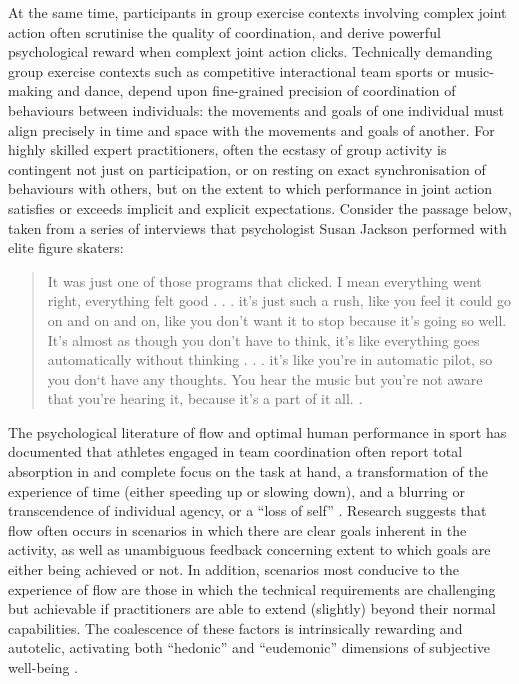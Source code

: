 \begin{CJK}{UTF8}{gbsn}
At the same time, participants in group exercise contexts involving complex joint action often scrutinise the quality of coordination, and derive powerful psychological reward when complext joint action clicks.  Technically demanding group exercise contexts such as competitive interactional team sports or music-making and dance, depend upon fine-grained precision of coordination of behaviours between individuals: the movements and goals of one individual must align precisely in time and space with the movements and goals of another.  For highly skilled expert practitioners, often the ecstasy of group activity is contingent not just on participation, or on resting on exact synchronisation of behaviours with others, but on the extent to which performance in joint action satisfies or exceeds implicit and explicit expectations.  Consider the passage below, taken from a series of interviews that psychologist Susan Jackson performed with elite figure skaters:
  \begin{quotation}
    It was just one of those programs that clicked. I mean everything went right, everything felt good . . . it's just such a rush, like you feel it could go on and on and on, like you don't want it to stop because it's going so well.  It's almost as though you don't have to think, it's like everything goes automatically without thinking . . . it's like you're in automatic pilot, so you don‘t have any thoughts.  You hear the music but you're not aware that you're hearing it, because it's a part of it all. \citep[168]{Jackson1992}.
  \end{quotation}

The psychological literature of flow and optimal human performance in sport has documented that athletes engaged in team coordination often report total absorption in and complete focus on the task at hand, a transformation of the experience of time (either speeding up or slowing down), and a blurring or transcendence of individual agency, or a ``loss of self''   \citep{Csikszentmihalyi1992,Jackson1995,Jackson1999,McNeill1995}.  Research suggests that flow often occurs in scenarios in which there are clear goals inherent in the activity, as well as unambiguous feedback concerning extent to which goals are either being achieved or not.  In addition, scenarios most conducive to the experience of flow are those in which the technical requirements are challenging but achievable if practitioners are able to extend (slightly) beyond their normal capabilities\citep{Fong2015}.  The coalescence of these factors is intrinsically rewarding and autotelic\citep{Csikszentmihalyi1975}, activating both ``hedonic'' and ``eudemonic'' dimensions of subjective well-being \citep{Huta2010,Fave2009}.


\end{CJK}
